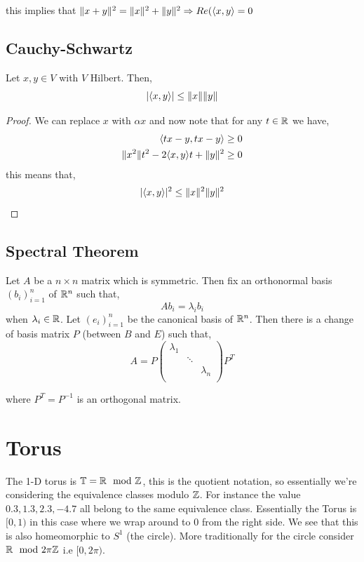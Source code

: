this implies that $\lVert x + y\rVert^2 = \lVert x\rVert^2 + \lVert y\rVert^2 \Rightarrow Re(\langle x, y \rangle = 0$


\subsection{Cauchy-Schwartz}
Let $x, y \in V$ with $V$ Hilbert. Then, 
\[
  | \langle x, y \rangle | \le \lVert x\rVert \lVert y\rVert
\]
\begin{proof}
  We can replace $x$ with $\alpha x$ and now note that for any $t \in \mathbb{R}$ we have, 
  \begin{align*}
    \langle tx - y, tx - y \rangle &\ge 0\\
    \lVert x^2\rVert t^2 - 2\langle x, y \rangle t + \lVert y\rVert^2 &\ge 0
  \end{align*}
  this means that,  
  \[
    | \langle x, y \rangle |^2 \le \lVert x\rVert^2 \lVert y\rVert^2
  \]
\end{proof}

\subsection{Spectral Theorem}
\begin{theorem}
  Let $A$ be a $n \times n$ matrix which is symmetric. Then fix an orthonormal basis $(b_i)_{i = 1}^{n}$ of $\mathbb{R}^{n}$ such that, 
  \[
    A b_i = \lambda_i b_i
  \]
  when $\lambda_i \in \mathbb{R}$. Let $(e_i)^{n}_{i = 1} $ be the canonical basis of $\mathbb{R}^{n}$. Then there is a change of basis matrix $P$ (between $B$ and $E$) such that, 
  \[
    A = P \begin{pmatrix}
      \lambda_{1}  &  \\
      &  \ddots &  \\
      &  & \lambda_n \\
    \end{pmatrix} P^{T}
  \]

  where $P^{T} = P^{-1}$ is an orthogonal matrix.
\end{theorem}

\section{Torus}
The 1-D torus is $\mathbb{T} = \mathbb{R} \mod {\mathbb{Z}}$, this is the quotient notation, so essentially we're considering the equivalence classes modulo $\mathbb{Z}$. For instance the value $0.3, 1.3, 2.3, -4.7$ all belong to the same equivalence class. Essentially the Torus is $[0, 1)$ in this case where we wrap around to $0$ from the right side. We see that this is also homeomorphic to $S^{1}$  (the circle). More traditionally for the circle consider $\mathbb{R} \mod 2 \pi \mathbb{Z}$ i.e $[0, 2\pi)$.

